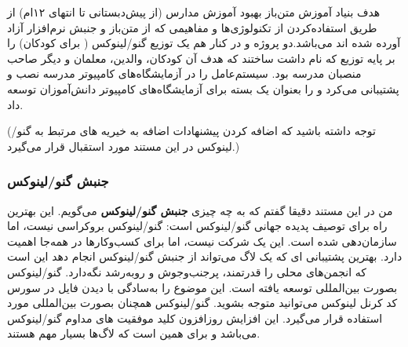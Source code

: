 \begin{itemize}
هدف بنیاد آموزش متن‌باز بهبود آموزش مدارس (از پیش‌دبستانی تا انتهای ۱۲ام)
از طریق استفاده‌کردن از تکنولوژی‌ها و مفاهیمی که از متن‌باز و جنبش نرم‌افزار آزاد
آورده شده اند می‌باشد.دو پروژه  و  در کنار هم یک توزیع گنو/لینوکس
(
برای کودکان) را بر پایه توزیع
که
نام داشت ساختند که هدف آن کودکان، والدین، معلمان و دیگر صاحب منصبان مدرسه بود.
سیستم‌عامل را در آزمایشگاه‌های کامپیوتر مدرسه نصب و پشتیبانی می‌کرد و
را بعنوان یک بسته
برای آزمایشگاه‌های کامپیوتر دانش‌آموزان توسعه داد.

\end{itemize}

(توجه داشته باشید که اضافه کردن پیشنهادات اضافه به خیریه های
مرتبط به گنو/لینوکس در این مستند مورد استقبال قرار می‌گیرد.)

\subsubsection{جنبش گنو/لینوکس}

من در این مستند دقیقا گفتم که به چه چیزی 
{\bfseries جنبش گنو/لینوکس}
می‌گویم. این بهترین راه برای توصیف پدیده جهانی گنو/لینوکس است:
گنو/لینوکس بروکراسی نیست، اما سازمان‌دهی شده است. این یک شرکت نیست،
اما برای کسب‌وکارها در همه‌جا اهمیت دارد. بهترین پشتیبانی ای که یک لاگ
می‌تواند از جنبش گنو/لینوکس انجام دهد این است که انجمن‌های محلی را قدرتمند،
پرجنب‌وجوش و روبه‌رشد نگه‌دارد.
گنو/لینوکس بصورت بین‌المللی توسعه یافته است. این موضوع را به‌سادگی
با دیدن فایل  در سورس کد کرنل لینوکس می‌توانید متوجه بشوید.
گنو/لینوکس همچنان بصورت بین‌المللی مورد استفاده قرار می‌گیرد.
این افزایش روزافزون
کلید موفقیت های مداوم گنو/لینوکس می‌باشد و برای همین است که لاگ‌ها بسیار مهم هستند.

